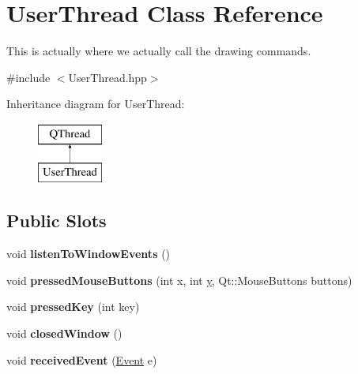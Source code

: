 \hypertarget{class_d_o_1_1_user_thread}{\section{User\-Thread Class Reference}
\label{class_d_o_1_1_user_thread}
}


This is actually where we actually call the drawing commands.  




{\ttfamily \#include $<$User\-Thread.\-hpp$>$}

Inheritance diagram for User\-Thread\-:\begin{figure}[H]
\begin{center}
\leavevmode
\includegraphics[height=2.000000cm]{class_d_o_1_1_user_thread}
\end{center}
\end{figure}
\subsection*{Public Slots}
\begin{DoxyCompactItemize}
\item 
\hypertarget{group___graphics_internal_ga17e8cfdefacfb6fc452b7505a5ddad42}{void {\bfseries listen\-To\-Window\-Events} ()}\label{group___graphics_internal_ga17e8cfdefacfb6fc452b7505a5ddad42}

\item 
\hypertarget{group___graphics_internal_ga211d59c0a6baf6072e762c542472efe6}{void {\bfseries pressed\-Mouse\-Buttons} (int x, int \hyperlink{group___channel_accessors_gac90c52c5b3a7b2a7e3761e6e84f25778}{y}, Qt\-::\-Mouse\-Buttons buttons)}\label{group___graphics_internal_ga211d59c0a6baf6072e762c542472efe6}

\item 
\hypertarget{group___graphics_internal_gaf3120a375a321654553779cf030a9508}{void {\bfseries pressed\-Key} (int key)}\label{group___graphics_internal_gaf3120a375a321654553779cf030a9508}

\item 
\hypertarget{group___graphics_internal_gab4b152469c806312bcb7fbbbcbccb6dc}{void {\bfseries closed\-Window} ()}\label{group___graphics_internal_gab4b152469c806312bcb7fbbbcbccb6dc}

\item 
\hypertarget{group___graphics_internal_ga2ea8e392e6f4fcb9fdb5b76e7bb02953}{void {\bfseries received\-Event} (\hyperlink{struct_d_o_1_1_event}{Event} e)}\label{group___graphics_internal_ga2ea8e392e6f4fcb9fdb5b76e7bb02953}

\end{DoxyCompactItemize}

